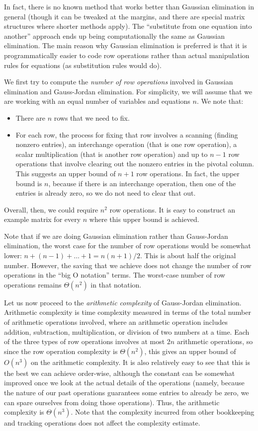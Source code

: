 \documentclass[10pt]{amsart}
\begin{document}
In fact, there is no known method that works better than Gaussian
elimination in general (though it can be tweaked at the margins, and
there are special matrix structures where shorter methods apply). The
``substitute from one equation into another'' approach ends up being
computationally the same as Gaussian elimination. The main reason why
Gaussian elimination is preferred is that it is programmatically
easier to code row operations rather than actual manipulation rules
for equations (as substitution rules would do).

We first try to compute the {\em number of row operations} involved in
Gaussian elimination and Gauss-Jordan elimination. For simplicity, we
will assume that we are working with an equal number of variables and
equations $n$. We note that:

\begin{itemize}
\item There are $n$ rows that we need to fix.
\item For each row, the process for fixing that row involves a
  scanning (finding nonzero entries), an interchange operation (that
  is one row operation), a scalar multiplication (that is another row
  operation) and up to $n - 1$ row operations that involve clearing
  out the nonzero entries in the pivotal column. This suggests an
  upper bound of $n + 1$ row operations. In fact, the upper bound is
  $n$, because if there is an interchange operation, then one of the
  entries is already zero, so we do not need to clear that out.
\end{itemize}

Overall, then, we could require $n^2$ row operations. It is easy to
construct an example matrix for every $n$ where this upper bound is
achieved.

Note that if we are doing Gaussian elimination rather than
Gauss-Jordan elimination, the worst case for the number of row
operations would be somewhat lower: $n + (n - 1) + \dots + 1 = n(n +
1)/2$. This is about half the original number. However, the saving
that we achieve does not change the number of row operations in the
``big O notation'' terms. The worst-case number of row operations
remains $\Theta(n^2)$ in that notation.

Let us now proceed to the {\em arithmetic complexity} of Gauss-Jordan
elimination. Arithmetic complexity is time complexity measured in
terms of the total number of arithmetic operations involved, where an
arithmetic operation includes addition, subtraction, multiplication,
or division of two numbers at a time. Each of the three types of row
operations involves at most $2n$ arithmetic operations, so since the
row operation complexity is $\Theta(n^2)$, this gives an upper bound
of $O(n^3)$ on the arithmetic complexity. It is also relatively easy
to see that this is the best we can achieve order-wise, although the
constant can be somewhat improved once we look at the actual details
of the operations (namely, because the nature of our past operations
guarantees some entries to already be zero, we can spare ourselves
from doing those operations). Thus, the arithmetic complexity is
$\Theta(n^3)$. Note that the complexity incurred from other
bookkeeping and tracking operations does not affect the complexity
estimate.
\end{document}

